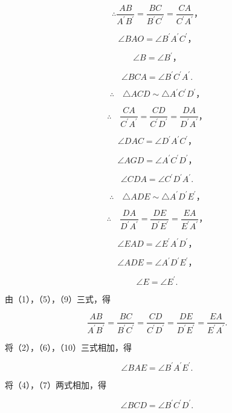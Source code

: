 \[
\therefore \frac {A B}{A ^ {\prime} B ^ {\prime}} = \frac {B C}{B ^ {\prime} C ^ {\prime}} = \frac {C A}{C ^ {\prime} A ^ {\prime}}\text{，} \tag {1}
\]

\[
\angle B A O = \angle B ^ {\prime} A ^ {\prime} C ^ {\prime}\text{，} \tag {2}
\]

\[
\angle B = \angle B ^ {\prime}\text{，} \tag {3}
\]

\[
\angle B C A = \angle B ^ {\prime} C ^ {\prime} A ^ {\prime}. \tag {4}
\]

\[
\therefore \quad \triangle A C D \sim \triangle A ^ {\prime} C ^ {\prime} D ^ {\prime}\text{，}
\]

\[
\therefore \quad \frac {C A}{C ^ {\prime} A ^ {\prime}} = \frac {C D}{C ^ {\prime} D ^ {\prime}} = \frac {D A}{D ^ {\prime} A ^ {\prime}}\text{，} \tag {5}
\]

\[
\angle D A C = \angle D ^ {\prime} A ^ {\prime} C ^ {\prime}\text{，} \tag {6}
\]

\[
\angle A G D = \angle A ^ {\prime} C ^ {\prime} D ^ {\prime}\text{，} \tag {7}
\]

\[
\angle C D A = \angle C ^ {\prime} D ^ {\prime} A ^ {\prime}. \tag {8}
\]

\[
\therefore \quad \triangle A D E \sim \triangle A ^ {\prime} D ^ {\prime} E ^ {\prime}\text{，}
\]

\[
\therefore \quad \frac {D A}{D ^ {\prime} A ^ {\prime}} = \frac {D E}{D ^ {\prime} E ^ {\prime}} = \frac {E A}{E ^ {\prime} A ^ {\prime}}\text{，} \tag {9}
\]

\[
\angle E A D = \angle E ^ {\prime} A ^ {\prime} D ^ {\prime}\text{，} \tag {10}
\]

\[
\angle A D E = \angle A ^ {\prime} D ^ {\prime} E ^ {\prime}\text{，} \tag {11}
\]

\[
\angle E = \angle E ^ {\prime}. \tag {12}
\]

由（1），（5），（9）三式，得

\[
\frac {A B}{A ^ {\prime} B ^ {\prime}} = \frac {B C}{B ^ {\prime} C ^ {\prime}} = \frac {C D}{C ^ {\prime} D ^ {\prime}} = \frac {D E}{D ^ {\prime} E ^ {\prime}} = \frac {E A}{E ^ {\prime} A ^ {\prime}}. \tag {13}
\]

将（2），（6），（10）三式相加，得

\[
\angle B A E = \angle B ^ {\prime} A ^ {\prime} E ^ {\prime}. \tag {14}
\]

将（4），（7）两式相加，得

\[
\angle B C D = \angle B ^ {\prime} C ^ {\prime} D ^ {\prime}. \tag {15}
\]

